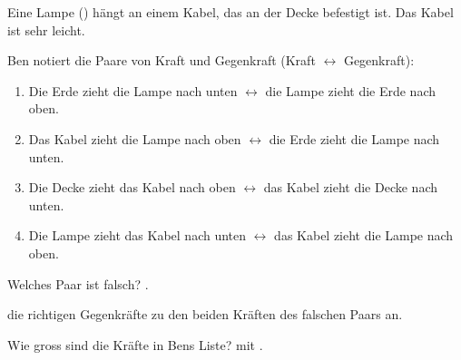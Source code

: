 Eine Lampe (\mLO) hängt an einem Kabel, das an der Decke befestigt ist. Das Kabel ist sehr leicht.

\begin{center}
\end{center}

Ben notiert die Paare von Kraft und Gegenkraft (Kraft $\leftrightarrow$ Gegenkraft):
\begin{enumerate}
\item Die Erde zieht die Lampe nach unten $\leftrightarrow$ die Lampe zieht die Erde nach oben.
\item Das Kabel zieht die Lampe nach oben $\leftrightarrow$ die Erde zieht die Lampe nach unten.
\item Die Decke zieht das Kabel nach oben $\leftrightarrow$ das Kabel zieht die Decke nach unten.
\item Die Lampe zieht das Kabel nach unten $\leftrightarrow$ das Kabel zieht die Lampe nach oben.
\end{enumerate}

\begin{abcliste}
\abc
Welches Paar ist falsch? .

\abc
{} die richtigen Gegenkräfte zu den beiden Kräften des falschen Paars an.

\abc
Wie gross sind die Kräfte in Bens Liste?  mit \gO.
\end{abcliste}
